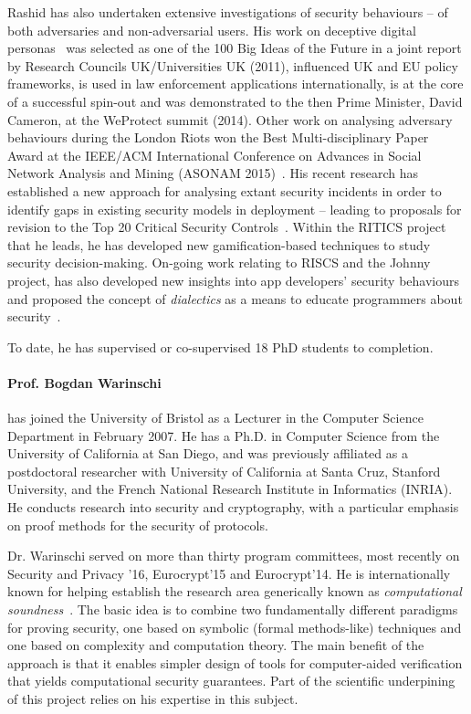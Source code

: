 \documentclass[10pt]{article}
\begin{document}
Rashid has also undertaken extensive investigations of security behaviours -- of both adversaries and non-adversarial users.
His work on deceptive digital personas~\cite{rashid2013} was selected as one of the 100 Big Ideas of the Future in a joint report by Research Councils UK/Universities UK (2011), influenced UK and EU policy frameworks, is used in law enforcement applications internationally, is at the core of a successful spin-out and was demonstrated to the then Prime Minister, David Cameron, at the WeProtect summit (2014). Other work on analysing adversary behaviours during the London Riots won the Best Multi-disciplinary Paper Award at the IEEE/ACM International Conference on Advances in Social Network Analysis and Mining (ASONAM 2015)~\cite{charitonidis2015}. His recent research has established a new approach for analysing extant security incidents in order to identify gaps in existing security models in deployment -- leading to proposals for revision to the Top 20 Critical Security Controls~\cite{rashid2016}. Within the RITICS project that he leads, he has developed new gamification-based techniques to study security decision-making. On-going work relating to RISCS and the Johnny project, has also developed new insights into app developers' security behaviours~\cite{weir2016} and proposed the concept of \textit{dialectics} as a means to educate programmers about security~\cite{weir2017}.  

To date, he has supervised or co-supervised 18 PhD students to completion.


\paragraph{Prof. Bogdan Warinschi} has joined the University of 
Bristol as a Lecturer in the Computer Science Department in February 2007. 
He has a Ph.D. in Computer Science from the University of California
at San Diego, and was previously affiliated as a postdoctoral researcher with
University of California at Santa Cruz, Stanford University, and the
French National Research Institute in Informatics (INRIA).
He conducts research into security and cryptography, with a particular emphasis on
proof methods for the security of protocols.


Dr. Warinschi served on more than thirty program committees, most recently on Security and Privacy '16, Eurocrypt'15 and Eurocrypt'14.  He is internationally known for helping establish the research area generically known as {\em computational   soundness}~\cite{micciancio04soundness,cortier05computationally}.
The basic idea is to combine two fundamentally different paradigms for proving security, one based on symbolic (formal methods-like) techniques and one based on complexity and computation theory. The main benefit of the approach is that it enables simpler design of tools for computer-aided verification that yields computational security guarantees. Part of the scientific underpining of this project relies on his expertise in this subject. 
\end{document}
